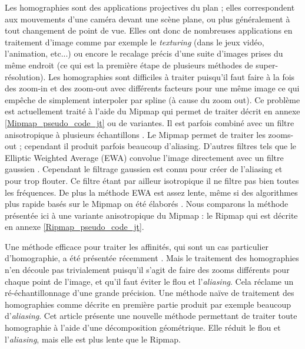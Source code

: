 Les homographies sont des applications projectives du plan ; elles correspondent aux mouvements d'une caméra devant une scène plane, ou plus généralement à tout changement de point de vue. Elles ont donc de nombreuses applications en traitement d'image comme par exemple le \emph{texturing} \cite{heckbert1983texture} (dans le jeux vidéo, l'animation, etc...) ou encore le recalage précis d'une suite d'images prises du même endroit \cite{brown2007automatic} (ce qui est la première étape de plusieurs méthodes de super-résolution). Les homographies sont difficiles à traiter puisqu'il faut faire à la fois des zoom-in et des zoom-out avec différents facteurs pour une même image ce qui empêche de simplement interpoler par spline (à cause du zoom out).  Ce problème est actuellement traité à l'aide du Mipmap qui permet de traiter \cite{williams1983pyramidal} décrit en annexe \ref{Mipmap_pseudo_code_jt} ou de variantes. Il est parfois combiné avec un filtre anisotropique à plusieurs échantillons  \cite{barkans1997high}. Le Mipmap permet de traiter les zooms-out ; cependant il produit parfois beaucoup d'aliasing.  D'autres filtres tels que le Elliptic Weighted Average (EWA) convolue l'image directement avec un filtre gaussien \cite{greene1986creating}. Cependant le filtrage gaussien est connu pour créer de l'aliasing et pour trop flouter. Ce filtre étant par ailleur isotropique il ne filtre pas bien toutes les fréquences. De plus la méthode EWA est assez lente, même si des algorithmes plus rapide basés sur le Mipmap on été élaborés \cite{mccormack1999feline,huttner1999fast}. Nous comparons la méthode présentée ici à une variante anisotropique du Mipmap : le Ripmap \cite{akenine2008real} qui est décrite en annexe \ref{Ripmap_pseudo_code_jt}.

	Une méthode efficace pour traiter les affinités, qui sont un cas particulier d'homographie, a été présentée récemment \cite{szeliski2010high}. Mais le traitement des homographies n'en découle pas trivialement puisqu'il s'agit de faire des zooms différents pour chaque point de l'image, et qu'il faut éviter le flou et l'\emph{aliasing}. Cela réclame un ré-échantillonnage d'une grande précision. Une méthode naïve de traitement des homographies comme décrite en première partie produit par exemple beaucoup d'\emph{aliasing}. Cet article présente une nouvelle méthode permettant de traiter toute homographie à l'aide d'une décomposition géométrique. Elle réduit le flou et l'\emph{aliasing}, mais elle est plus lente que le Ripmap.

